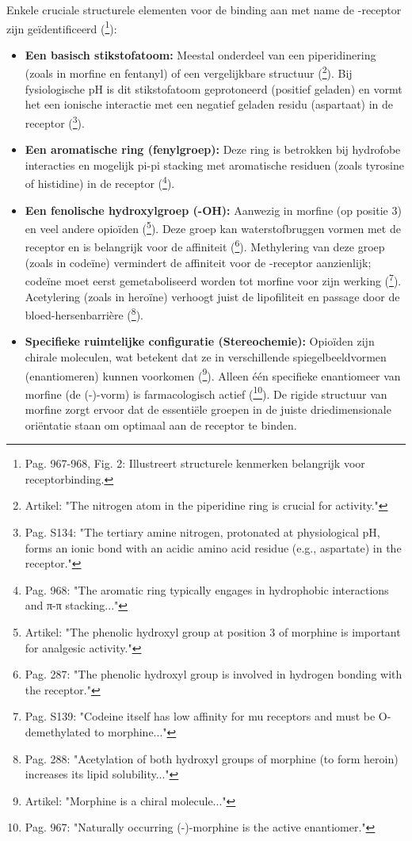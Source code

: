 \documentclass[11pt, a4paper]{report} %
\begin{document}
Enkele cruciale structurele elementen voor de binding aan met name de \textmu-receptor zijn geïdentificeerd (\cite{Shang2020MolecularBasis}\footnote{Pag. 967-968, Fig. 2: Illustreert structurele kenmerken belangrijk voor receptorbinding.}):
\begin{itemize}
    \item \textbf{Een basisch stikstofatoom:} Meestal onderdeel van een piperidinering (zoals in morfine en fentanyl) of een vergelijkbare structuur (\cite{NewsMedicalMorphineChem}\footnote{Artikel: "The nitrogen atom in the piperidine ring is crucial for activity."}). Bij fysiologische pH is dit stikstofatoom geprotoneerd (positief geladen) en vormt het een ionische interactie met een negatief geladen residu (aspartaat) in de receptor (\cite{Trescot2008OpioidPharm}\footnote{Pag. S134: "The tertiary amine nitrogen, protonated at physiological pH, forms an ionic bond with an acidic amino acid residue (e.g., aspartate) in the receptor."}).
    \item \textbf{Een aromatische ring (fenylgroep):} Deze ring is betrokken bij hydrofobe interacties en mogelijk pi-pi stacking met aromatische residuen (zoals tyrosine of histidine) in de receptor (\cite{Shang2020MolecularBasis}\footnote{Pag. 968: "The aromatic ring typically engages in hydrophobic interactions and π-π stacking..."}).
    \item \textbf{Een fenolische hydroxylgroep (-OH):} Aanwezig in morfine (op positie 3) en veel andere opioïden (\cite{NewsMedicalMorphineChem}\footnote{Artikel: "The phenolic hydroxyl group at position 3 of morphine is important for analgesic activity."}). Deze groep kan waterstofbruggen vormen met de receptor en is belangrijk voor de affiniteit (\cite{Gupta2010ChemistryOpioids}\footnote{Pag. 287: "The phenolic hydroxyl group is involved in hydrogen bonding with the receptor."}). Methylering van deze groep (zoals in codeïne) vermindert de affiniteit voor de \textmu-receptor aanzienlijk; codeïne moet eerst gemetaboliseerd worden tot morfine voor zijn werking (\cite{Trescot2008OpioidPharm}\footnote{Pag. S139: "Codeine itself has low affinity for mu receptors and must be O-demethylated to morphine..."}). Acetylering (zoals in heroïne) verhoogt juist de lipofiliteit en passage door de bloed-hersenbarrière (\cite{Gupta2010ChemistryOpioids}\footnote{Pag. 288: "Acetylation of both hydroxyl groups of morphine (to form heroin) increases its lipid solubility..."}).
    \item \textbf{Specifieke ruimtelijke configuratie (Stereochemie):} Opioïden zijn chirale moleculen, wat betekent dat ze in verschillende spiegelbeeldvormen (enantiomeren) kunnen voorkomen (\cite{NewsMedicalMorphineChem}\footnote{Artikel: "Morphine is a chiral molecule..."}). Alleen één specifieke enantiomeer van morfine (de (-)-vorm) is farmacologisch actief (\cite{Shang2020MolecularBasis}\footnote{Pag. 967: "Naturally occurring (-)-morphine is the active enantiomer."}). De rigide structuur van morfine zorgt ervoor dat de essentiële groepen in de juiste driedimensionale oriëntatie staan om optimaal aan de receptor te binden.
\end{itemize}
\end{document}
